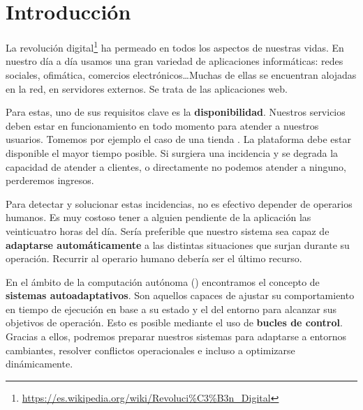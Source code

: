
\chapter{Introducción}
\label{chap:introduccion}

La revolución digital\footnote{\url{https://es.wikipedia.org/wiki/Revoluci\%C3\%B3n_Digital}} ha permeado en todos los aspectos de nuestras vidas. En nuestro día a día usamos una gran variedad de aplicaciones informáticas: redes sociales, ofimática, comercios electrónicos\dots Muchas de ellas se encuentran alojadas en la red, en servidores externos. Se trata de las aplicaciones web.

Para estas, uno de sus requisitos clave es la \textbf{disponibilidad}. \cite{birmanAddingHighAvailability2004} Nuestros servicios deben estar en funcionamiento en todo momento para atender a nuestros usuarios. Tomemos por ejemplo el caso de una tienda . La plataforma debe estar disponible el mayor tiempo posible. Si surgiera una incidencia y se degrada la capacidad de atender a clientes, o directamente no podemos atender a ninguno, perderemos ingresos.

Para detectar y solucionar estas incidencias, no es efectivo depender de operarios humanos. \cite{ibmArchitecturalBlueprintAutonomic2006} Es muy costoso tener a alguien pendiente de la aplicación las veinticuatro horas del día. Sería preferible que nuestro sistema sea capaz de \textbf{adaptarse automáticamente} a las distintas situaciones que surjan durante su operación. Recurrir al operario humano debería ser el último recurso.

En el ámbito de la computación autónoma () encontramos el concepto de \textbf{sistemas autoadaptativos}. Son aquellos capaces de ajustar su comportamiento en tiempo de ejecución en base a su estado y el del entorno para alcanzar sus objetivos de operación. \cite{ibmArchitecturalBlueprintAutonomic2006} Esto es posible mediante el uso de \textbf{bucles de control}. \cite{brunEngineeringSelfAdaptiveSystems2009} Gracias a ellos, podremos preparar nuestros sistemas para adaptarse a entornos cambiantes, resolver conflictos operacionales e incluso a optimizarse dinámicamente.

